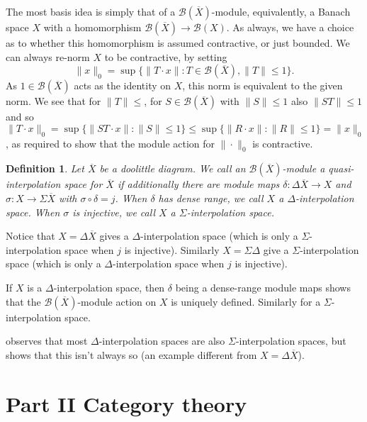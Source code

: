 \documentclass[a4paper,11pt]{article}
\theoremstyle{plain}
\newtheorem{definition}[proposition]{Definition}
\theoremstyle{remark}
\newcommand{\mc}[1]{\mathcal{#1}}
\begin{document}
The most basis idea is simply that of a $\mc B(\overline X)$-module, equivalently, a Banach space $X$ with a homomorphism $\mc B(\overline X) \to \mc B(X)$.  As always, we have a choice as to whether this homomorphism is assumed contractive, or just bounded.  We can always re-norm $X$ to be contractive, by setting
\[ \| x \|_0 = \sup\{ \|T\cdot x \| : T\in\mc B(\overline X), \|T\|\leq 1 \}. \]
As $1\in\mc B(\overline X)$ acts as the identity on $X$, this norm is equivalent to the given norm.  We see that for $\|T\|\leq $, for $S\in\mc B(\overline X)$ with $\|S\|\leq 1$ also $\|ST\|\leq 1$ and so $\|T\cdot x\|_0 = \sup\{ \|ST\cdot x\| : \|S\|\leq 1 \} \leq \sup\{ \|R\cdot x\| : \|R\|\leq 1 \} = \|x\|_0$, as required to show that the module action for $\|\cdot\|_0$ is contractive.

\begin{definition}\label{defn:int_space}
Let $\overline X$ be a doolittle diagram.  We call an $\mc B(\overline X)$-module a \emph{quasi-interpolation space} for $\overline X$ if additionally there are module maps $\delta \colon \Delta\overline X \to X$ and $\sigma\colon X\to\Sigma\overline X$ with $\sigma\circ\delta = j$.  When $\delta$ has dense range, we call $X$ a \emph{$\Delta$-interpolation space}.  When $\sigma$ is injective, we call $X$ a \emph{$\Sigma$-interpolation space}.
\end{definition}

Notice that $X = \Delta\overline X$ gives a $\Delta$-interpolation space (which is only a $\Sigma$-interpolation space when $j$ is injective).  Similarly $X = \Sigma\Delta$ give a $\Sigma$-interpolation space (which is only a $\Delta$-interpolation space when $j$ is injective).

If $X$ is a $\Delta$-interpolation space, then $\delta$ being a dense-range module maps shows that the $\mc B(\overline X)$-module action on $X$ is uniquely defined.  Similarly for a $\Sigma$-interpolation space.

\cite{KP_InterpolationFunctorsDuality} observes that most $\Delta$-interpolation spaces are also $\Sigma$-interpolation spaces, but \cite[Example~I.3.2]{KP_InterpolationFunctorsDuality} shows that this isn't always so (an example different from $X = \Delta\overline X$).



\section{Part II Category theory}
\end{document}

